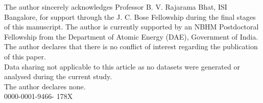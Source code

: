 \documentclass[a4paper,11pt, reqno]{amsart}
\theoremstyle{definition}
\begin{document}
 The author sincerely acknowledges Professor B. V. Rajarama Bhat, ISI Bangalore, for support through the J. C. Bose Fellowship during the final stages of this manuscript. The author is currently supported by an NBHM Postdoctoral Fellowship from the Department of Atomic Energy (DAE), Government of India.\\

 The author declares that there is no conflict of interest regarding the publication of this paper.\\

 Data sharing not applicable to this article as no datasets were generated or analysed during the current study.\\

 The author declares none.\\

 0000-0001-9466-
178X
\end{document}
